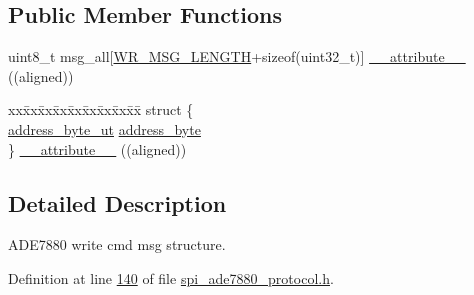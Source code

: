 \subsection*{Public Member Functions}
\begin{DoxyCompactItemize}
\item 
uint8\-\_\-t msg\-\_\-all\mbox{[}\hyperlink{a00041_ac85ecf34a5cbd85d6dbd51b4c9a5469e}{W\-R\-\_\-\-M\-S\-G\-\_\-\-L\-E\-N\-G\-T\-H}+sizeof(uint32\-\_\-t)\mbox{]} \hyperlink{a00016_a1649e1bd9e3b85107dbd32225b489e11}{\-\_\-\-\_\-attribute\-\_\-\-\_\-} ((aligned))
\item 
\begin{tabbing}
xx\=xx\=xx\=xx\=xx\=xx\=xx\=xx\=xx\=\kill
struct \{\\
\>\hyperlink{a00011}{address\_byte\_ut} \hyperlink{a00016_af6a65bac733ea3e9b1d24b065163d49a}{address\_byte}\\
\} \hyperlink{a00016_a685293c03741e668f87da618aa1f469a}{\_\_attribute\_\_} ((aligned))\\

\end{tabbing}\end{DoxyCompactItemize}


\subsection{Detailed Description}
A\-D\-E7880 write cmd msg structure. 

Definition at line \hyperlink{a00041_source_l00140}{140} of file \hyperlink{a00041_source}{spi\-\_\-ade7880\-\_\-protocol.\-h}.




